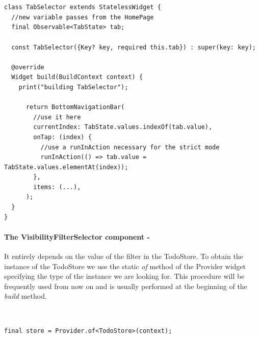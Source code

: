 \begin{code}
\mbox{}\\
 \mbox{}
		\label{code:2.14}
\begin{verbatim}

class TabSelector extends StatelessWidget {
  //new variable passes from the HomePage
  final Observable<TabState> tab; 

  const TabSelector({Key? key, required this.tab}) : super(key: key);

  @override
  Widget build(BuildContext context) {
    print("building TabSelector");

      return BottomNavigationBar( 
        //use it here
        currentIndex: TabState.values.indexOf(tab.value),
        onTap: (index) {
          //use a runInAction necessary for the strict mode
          runInAction(() => tab.value = TabState.values.elementAt(index));
        },
        items: (...),
      );
  }
}
\end{verbatim}
\mbox{}
\end{code}
\paragraph{The VisibilityFilterSelector component - }
\label{subpar:todo_app_bloc_core_state}It entirely depends on the value of the filter in the TodoStore. To obtain the instance of the TodoStore we use the static \textit{of} method of the Provider widget specifying the type of the instance we are looking for. This procedure will be frequently used from now on and is usually performed at the beginning of the \textit{build} method. 
\begin{code}
\mbox{}\\
 \mbox{}
		\label{code:2.132}
\begin{verbatim}
final store = Provider.of<TodoStore>(context);
\end{verbatim}
\mbox{}
\end{code}

